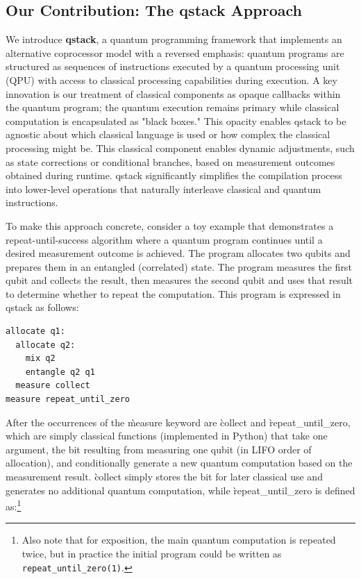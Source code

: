 \subsection{Our Contribution: The qstack Approach}

We introduce \textbf{qstack}, a quantum programming framework that implements an alternative coprocessor model with a reversed emphasis: quantum programs are structured as sequences of instructions executed by a quantum processing unit (QPU) with access to classical processing capabilities during execution. A key innovation is our treatment of classical components as opaque callbacks within the quantum program; the quantum execution remains primary while classical computation is encapsulated as "black boxes."  This opacity enables qstack to be agnostic about which classical language is used or how complex the classical processing might be. This classical component enables dynamic adjustments, such as state corrections or conditional branches, based on measurement outcomes obtained during runtime. qstack significantly simplifies the compilation process into lower-level operations that naturally interleave classical and quantum instructions.

To make this approach concrete, consider a toy example that demonstrates a repeat-until-success algorithm where a quantum program continues until a desired measurement outcome is achieved.
The program allocates two qubits and prepares them in an entangled (correlated) state. The program measures the first qubit and collects the result, then measures the second qubit and uses that result to determine whether to repeat the computation. This program is expressed in qstack as follows:

\begin{verbatim}
allocate q1:
  allocate q2:
    mix q2
    entangle q2 q1
  measure collect
measure repeat_until_zero
\end{verbatim}

After the occurrences of the \`{measure} keyword are \`{collect} and \`{repeat\_until\_zero}, which are simply classical functions (implemented in Python) that take one argument, the bit resulting from measuring one qubit (in LIFO order of allocation), and conditionally generate a new quantum computation based on the measurement result. \`{collect} simply stores the bit for later classical use and generates no additional quantum computation, while \`{repeat\_until\_zero} is defined as:\footnote{Also note that for exposition, the main quantum computation is repeated twice, but in practice the initial program could be written as \texttt{repeat\_until\_zero(1)}.}

